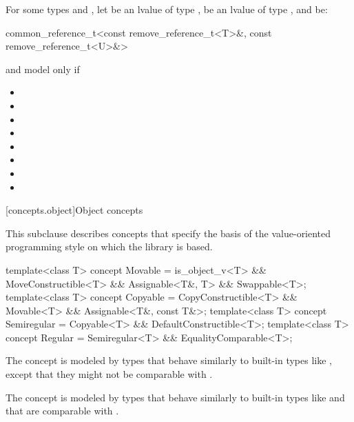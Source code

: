 \begin{itemdescr}
\pnum
For some types  and ,
let  be an lvalue of type ,
 be an lvalue of type ,
and  be:
\begin{codeblock}
common_reference_t<const remove_reference_t<T>&, const remove_reference_t<U>&>
\end{codeblock}
 and  model
 only if

\begin{itemize}
\item {}
\item {}
\item {}
\item {}
\item {}
\item {}
\item {}
\item {}
\end{itemize}
\end{itemdescr}

[concepts.object]{Object concepts}

\pnum
This subclause describes concepts that specify the basis of the
value-oriented programming style on which the library is based.

%
%
%
%
\begin{itemdecl}
template<class T>
  concept Movable = is_object_v<T> && MoveConstructible<T> && Assignable<T&, T> && Swappable<T>;
template<class T>
  concept Copyable = CopyConstructible<T> && Movable<T> && Assignable<T&, const T&>;
template<class T>
  concept Semiregular = Copyable<T> && DefaultConstructible<T>;
template<class T>
  concept Regular = Semiregular<T> && EqualityComparable<T>;
\end{itemdecl}

\begin{itemdescr}
\pnum
\begin{note}
The  concept is modeled by types that behave similarly
to built-in types like , except that they might not
be comparable with \tcode{==}.
\end{note}

\pnum
\begin{note}
The  concept is modeled by types that behave similarly to
built-in types like  and that are comparable with
\tcode{==}.
\end{note}
\end{itemdescr}

